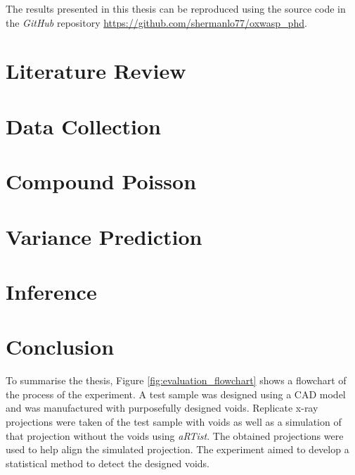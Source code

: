\documentclass[12pt, a4paper, oneside]{memoir}
\begin{document}
The results presented in this thesis can be reproduced using the source code in the \emph{GitHub} repository \url{https://github.com/shermanlo77/oxwasp_phd}.

\chapter{Literature Review}
\label{chapter1}


\chapter{Data Collection}
\label{chapter2}


\chapter{Compound Poisson}
\label{chapter3}


\chapter{Variance Prediction}
\label{chapter4}


\chapter{Inference}
\label{chapter5}


\chapter{Conclusion}
\label{chapter6}
To summarise the thesis, Figure \ref{fig:evaluation_flowchart} shows a flowchart of the process of the experiment. A test sample was designed using a CAD model and was manufactured with purposefully designed voids. Replicate x-ray projections were taken of the test sample with voids as well as a simulation of that projection without the voids using \emph{aRTist}. The obtained projections were used to help align the simulated projection. The experiment aimed to develop a statistical method to detect the designed voids.
\end{document}

